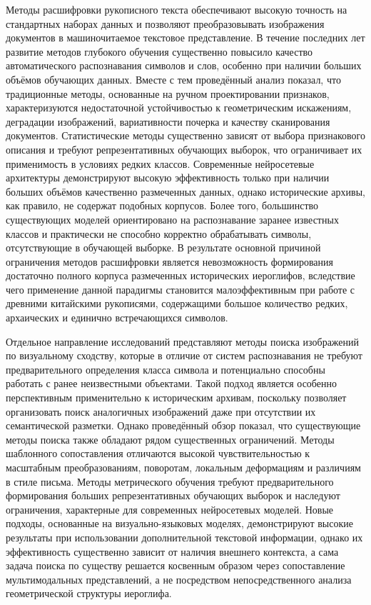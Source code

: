 Методы расшифровки рукописного текста обеспечивают высокую точность на стандартных наборах данных и позволяют преобразовывать изображения документов в машиночитаемое текстовое представление. В течение последних лет развитие методов глубокого обучения существенно повысило качество автоматического распознавания символов и слов, особенно при наличии больших объёмов обучающих данных. Вместе с тем проведённый анализ показал, что традиционные методы, основанные на ручном проектировании признаков, характеризуются недостаточной устойчивостью к геометрическим искажениям, деградации изображений, вариативности почерка и качеству сканирования документов. Статистические методы существенно зависят от выбора признакового описания и требуют репрезентативных обучающих выборок, что ограничивает их применимость в условиях редких классов. Современные нейросетевые архитектуры демонстрируют высокую эффективность только при наличии больших объёмов качественно размеченных данных, однако исторические архивы, как правило, не содержат подобных корпусов. Более того, большинство существующих моделей ориентировано на распознавание заранее известных классов и практически не способно корректно обрабатывать символы, отсутствующие в обучающей выборке. В результате основной причиной ограничения методов расшифровки является невозможность формирования достаточно полного корпуса размеченных исторических иероглифов, вследствие чего применение данной парадигмы становится малоэффективным при работе с древними китайскими рукописями, содержащими большое количество редких, архаических и единично встречающихся символов.

Отдельное направление исследований представляют методы поиска изображений по визуальному сходству, которые в отличие от систем распознавания не требуют предварительного определения класса символа и потенциально способны работать с ранее неизвестными объектами. Такой подход является особенно перспективным применительно к историческим архивам, поскольку позволяет организовать поиск аналогичных изображений даже при отсутствии их семантической разметки. Однако проведённый обзор показал, что существующие методы поиска также обладают рядом существенных ограничений. Методы шаблонного сопоставления отличаются высокой чувствительностью к масштабным преобразованиям, поворотам, локальным деформациям и различиям в стиле письма. Методы метрического обучения требуют предварительного формирования больших репрезентативных обучающих выборок и наследуют ограничения, характерные для современных нейросетевых моделей. Новые подходы, основанные на визуально-языковых моделях, демонстрируют высокие результаты при использовании дополнительной текстовой информации, однако их эффективность существенно зависит от наличия внешнего контекста, а сама задача поиска по существу решается косвенным образом через сопоставление мультимодальных представлений, а не посредством непосредственного анализа геометрической структуры иероглифа.


